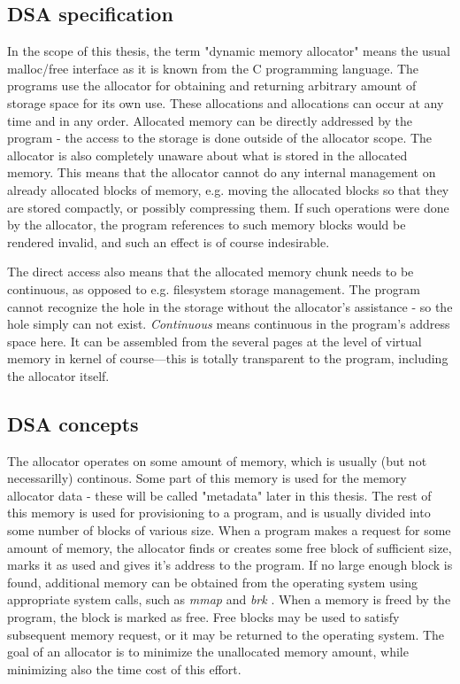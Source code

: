 \subsection{DSA specification}

In the scope of this thesis, the term "dynamic memory allocator" means the usual
malloc/free interface as it is known from the C programming language. The
programs use the allocator for obtaining and returning arbitrary amount of
storage space for its own use. These allocations and allocations can occur at any
time and in any order. Allocated memory can be directly addressed by the program
- the access to the storage is done outside of the allocator scope. The allocator
is also completely unaware about what is stored in the allocated memory. This
means that the allocator cannot do any internal management on already allocated
blocks of memory, e.g. moving the allocated blocks so that they are stored
compactly, or possibly compressing them. If such operations were done by the
allocator, the program references to such memory blocks would be rendered
invalid, and such an effect is of course indesirable.

The direct access also means that the allocated memory chunk needs to be
continuous, as opposed to e.g. filesystem storage management. The program cannot
recognize the hole in the storage without the allocator's assistance - so the
hole simply can not exist. {\em Continuous} means continuous in the program's
address space here. It can be assembled from the several pages at the level of
virtual memory in kernel of course---this is totally transparent to the program,
including the allocator itself.

\subsection{DSA concepts}

The allocator operates on some amount of memory, which is usually (but not
necessarilly) continous. Some part of this memory is used for the memory
allocator data - these will be called "metadata" later in this thesis. The rest
of this memory is used for provisioning to a program, and is usually divided into
some number of blocks of various size. When a program makes a request for some
amount of memory, the allocator finds or creates some free block of sufficient
size, marks it as used and gives it's address to the program. If no large enough
block is found, additional memory can be obtained from the operating system using
appropriate system calls, such as {\em mmap} and {\em brk} \cite{sbrk-manpage,
mmap-manpage}. When a memory is freed by the program, the block is marked as
free. Free blocks may be used to satisfy subsequent memory request, or it may be
returned to the operating system. The goal of an allocator is to minimize the
unallocated memory amount, while minimizing also the time cost of this effort.

